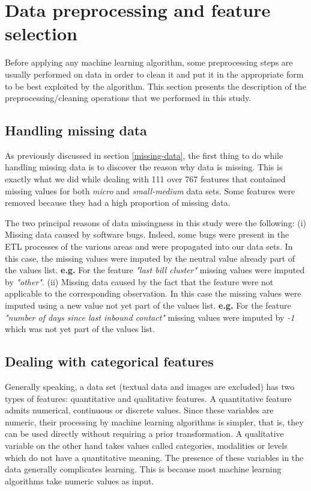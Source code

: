 \documentclass[LaM,binding=0.6cm, english]{sapthesis}
\begin{document}
\section{Data preprocessing and feature selection}

Before applying any machine learning algorithm, some preprocessing steps are usually performed on data in order to clean it and put it in the appropriate form to be best exploited by the algorithm. This section presents the description of the preprocessing/cleaning operations that we performed in this study.

\subsection{Handling missing data}

As previously discussed in section \ref{missing-data}, the first thing to do while handling missing data is to discover the reason why data is missing. This is exactly what we did while dealing with 111 over 767 features that contained missing values for both \textit{micro} and \textit{small-medium} data sets. Some features were removed because they had a high proportion of missing data.

The two principal reasons of data missingness in this study were the following: (i) Missing data caused by software bugs. Indeed, some bugs were present in the ETL processes of the various areas and were propagated into our data sets. In this case, the missing values were imputed by the neutral value already part of the values list. \textbf{e.g.} For the feature \textit{"last bill cluster"} missing values were imputed by \textit{"other"}. (ii) Missing data caused by the fact that the feature were not applicable to the corresponding observation. In this case the missing values were imputed using a new value not yet part of the values list. \textbf{e.g.} For the feature \textit{"number of days since last inbound contact"} missing values were imputed by \textit{-1} which was not yet part of the values list.

\subsection{Dealing with categorical features}

Generally speaking, a data set (textual data and images are excluded) has two types of features: quantitative and qualitative features. A quantitative feature admits numerical, continuous or discrete values. Since these variables are numeric, their processing by machine learning algorithms is simpler, that is, they can be used directly without requiring a prior transformation. A qualitative variable on the other hand takes values called categories, modalities or levels which do not have a quantitative meaning. The presence of these variables in the data generally complicates learning. This is because most machine learning algorithms take numeric values as input.
\end{document}
